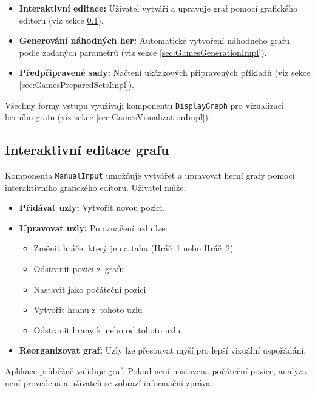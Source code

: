 \begin{itemize}
    \item \textbf{Interaktivní editace:} Uživatel vytváří a upravuje graf pomocí grafického editoru (viz sekce \ref{sec:GamesInteractiveImpl}).
    \item \textbf{Generování náhodných her:} Automatické vytvoření náhodného grafu podle zadaných parametrů (viz sekce \ref{sec:GamesGenerationImpl}).
\item \textbf{Předpřipravené sady:} Načtení ukázkových připravených příkladů (viz sekce \ref{sec:GamesPreparedSetsImpl}).
\end{itemize}

Všechny formy vstupu využívají komponentu \texttt{DisplayGraph} pro vizualizaci herního grafu (viz sekce \ref{sec:GamesVisualizationImpl}).  

\subsection{Interaktivní editace grafu}
\label{sec:GamesInteractiveImpl}

Komponenta \texttt{ManualInput} umožňuje vytvářet a upravovat herní grafy pomocí interaktivního grafického editoru. Uživatel může:

\begin{itemize}
    \item \textbf{Přidávat uzly:} Vytvořit novou pozici.

    \item \textbf{Upravovat uzly:} Po označení uzlu lze:
    \begin{itemize}
        \item Změnit hráče, který je na tahu (Hráč~1 nebo Hráč~2)
        \item Odstranit pozici z~grafu
        \item Nastavit jako počáteční pozici
        \item Vytvořit hranu z~tohoto uzlu
        \item Odstranit hrany k~nebo od tohoto uzlu
    \end{itemize}
            
    \item \textbf{Reorganizovat graf:} Uzly lze přesouvat myší pro lepší vizuální uspořádání.
\end{itemize}

Aplikace průběžně validuje graf. Pokud není nastavena počáteční pozice, analýza není provedena a uživateli se zobrazí informační zpráva.

